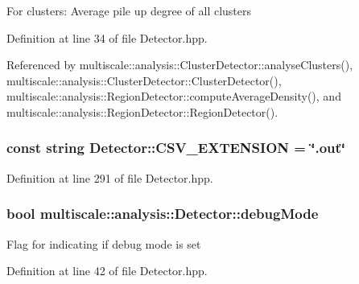 \-For clusters\-: \-Average pile up degree of all clusters 

\-Definition at line 34 of file \-Detector.\-hpp.



\-Referenced by multiscale\-::analysis\-::\-Cluster\-Detector\-::analyse\-Clusters(), multiscale\-::analysis\-::\-Cluster\-Detector\-::\-Cluster\-Detector(), multiscale\-::analysis\-::\-Region\-Detector\-::compute\-Average\-Density(), and multiscale\-::analysis\-::\-Region\-Detector\-::\-Region\-Detector().

\hypertarget{classmultiscale_1_1analysis_1_1Detector_a5458417daa8430ea8ebbe1c25cb26f41}{
\subsubsection[{\-C\-S\-V\-\_\-\-E\-X\-T\-E\-N\-S\-I\-O\-N}]{\setlength{\rightskip}{0pt plus 5cm}const string {\bf \-Detector\-::\-C\-S\-V\-\_\-\-E\-X\-T\-E\-N\-S\-I\-O\-N} = \char`\"{}.out\char`\"{}}}\label{classmultiscale_1_1analysis_1_1Detector_a5458417daa8430ea8ebbe1c25cb26f41}


\-Definition at line 291 of file \-Detector.\-hpp.

\hypertarget{classmultiscale_1_1analysis_1_1Detector_a4b42f796957efd6ee0b8cf7645494a65}{
\subsubsection[{debug\-Mode}]{\setlength{\rightskip}{0pt plus 5cm}bool {\bf multiscale\-::analysis\-::\-Detector\-::debug\-Mode}}}\label{classmultiscale_1_1analysis_1_1Detector_a4b42f796957efd6ee0b8cf7645494a65}
\-Flag for indicating if debug mode is set 

\-Definition at line 42 of file \-Detector.\-hpp.

